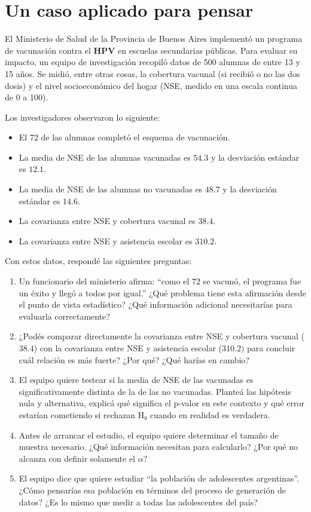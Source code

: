 \documentclass[
  letterpaper,
  DIV=11,
  numbers=noendperiod,
  oneside]{scrreprt}
\begin{document}
\hypertarget{un-caso-aplicado-para-pensar}{%
\section{Un caso aplicado para
pensar}\label{un-caso-aplicado-para-pensar}}

El Ministerio de Salud de la Provincia de Buenos Aires implementó un
programa de vacunación contra el \textbf{HPV} en escuelas secundarias
públicas. Para evaluar su impacto, un equipo de investigación recopiló
datos de 500 alumnas de entre 13 y 15 años. Se midió, entre otras cosas,
la cobertura vacunal (si recibió o no las dos dosis) y el nivel
socioeconómico del hogar (NSE, medido en una escala continua de 0 a
100).

Los investigadores observaron lo siguiente:

\begin{itemize}
\item
  El \(72%
  \) de las alumnas completó el esquema de vacunación.
\item
  La media de NSE de las alumnas vacunadas es \(54.3\) y la desviación
  estándar es \(12.1\).
\item
  La media de NSE de las alumnas no vacunadas es \(48.7\) y la
  desviación estándar es \(14.6\).
\item
  La covarianza entre NSE y cobertura vacunal es \(38.4\).
\item
  La covarianza entre NSE y asistencia escolar es \(310.2\).
\end{itemize}

Con estos datos, respondé las siguientes preguntas:

\begin{enumerate}
\def\labelenumi{\arabic{enumi}.}
\item
  Un funcionario del ministerio afirma: ``como el \(72%
  \) se vacunó, el programa fue un éxito y llegó a todos por igual.''
  ¿Qué problema tiene esta afirmación desde el punto de vista
  estadístico? ¿Qué información adicional necesitarías para evaluarla
  correctamente?
\item
  ¿Podés comparar directamente la covarianza entre NSE y cobertura
  vacunal (\(38.4\)) con la covarianza entre NSE y asistencia escolar
  (\(310.2)\) para concluir cuál relación es más fuerte? ¿Por qué? ¿Qué
  harías en cambio?
\item
  El equipo quiere testear si la media de NSE de las vacunadas es
  significativamente distinta de la de las no vacunadas. Planteá las
  hipótesis nula y alternativa, explicá qué significa el p-valor en este
  contexto y qué error estarían cometiendo si rechazan H₀ cuando en
  realidad es verdadera.
\item
  Antes de arrancar el estudio, el equipo quiere determinar el tamaño de
  muestra necesario. ¿Qué información necesitan para calcularlo? ¿Por
  qué no alcanza con definir solamente el \(\alpha\)?
\item
  El equipo dice que quiere estudiar ``la población de adolescentes
  argentinas''. ¿Cómo pensarías esa población en términos del proceso de
  generación de datos? ¿Es lo mismo que medir a todas las adolescentes
  del país?
\end{enumerate}
\end{document}
